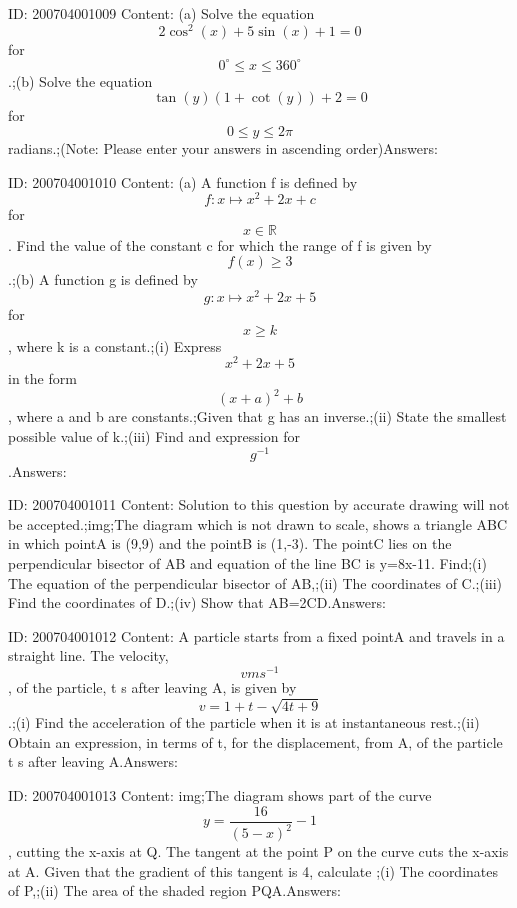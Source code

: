 \documentclass{article}
\begin{document}
ID: 200704001009
Content:
(a) Solve the equation $$2\cos ^2(x)+5\sin (x)+1=0$$ for $$0^{\circ}\leq x\leq360^{\circ}$$.;(b)	Solve the equation $$\tan (y)(1+\cot (y))+2=0$$ for $$0\leq y\leq2\pi$$ radians.;(Note: Please enter your answers in ascending order)Answers:

ID: 200704001010
Content:
(a)	A function f is defined by $$f:x \mapsto x^2+2x+c$$ for $$x \in \mathbb{R}$$. Find the value of the constant c for which the range of f is given by $$f(x)\geq3$$.;(b)	A function g is defined by $$g:x \mapsto x^2+2x+5$$ for $$x\geq k$$, where k is a constant.;(i)	Express $$x^2+2x+5$$ in the form $$(x+a)^2+b$$, where a and b are constants.;Given that g has an inverse.;(ii)	State the smallest possible value of k.;(iii)	Find and expression for $$g^{-1}$$.Answers:

ID: 200704001011
Content:
Solution to this question by accurate drawing will not be accepted.;img;The diagram which is not drawn to scale, shows a triangle ABC in which pointA is (9,9) and the pointB is (1,-3). The pointC lies on the perpendicular bisector of AB and equation of the line BC is y=8x-11. Find;(i) The equation of the perpendicular bisector of AB,;(ii) The coordinates of C.;(iii) Find the coordinates of D.;(iv) Show that AB=2CD.Answers:

ID: 200704001012
Content:
A particle starts from a fixed pointA and travels in a straight line. The velocity, $$vms^{-1}$$, of the particle, t s after leaving A, is given by $$v=1+t-\sqrt{4t+9}$$.;(i)	Find the acceleration of the particle when it is at instantaneous rest.;(ii) Obtain an expression, in terms of t, for the displacement, from A, of the particle t s after leaving A.Answers:

ID: 200704001013
Content:
img;The diagram shows part of the curve $$y=\frac{16}{(5-x)^2 }-1$$, cutting the x-axis at Q. The tangent at the point P on the curve cuts the x-axis at A. Given that the gradient of this tangent is 4, calculate ;(i) The coordinates of P,;(ii) The area of the shaded region PQA.Answers:
\end{document}
